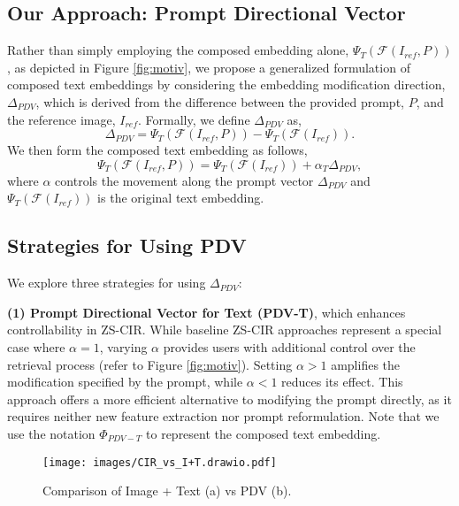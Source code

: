 \subsection{Our Approach: Prompt Directional Vector}

Rather than simply employing the composed embedding alone, $\Psi_T(\mathcal{F}(I_{ref}, P))$, as depicted in Figure \ref{fig:motiv},
we propose a generalized formulation of composed text embeddings by considering the embedding modification direction, $\Delta_{PDV}$, which is derived from the difference between the provided prompt, $P$, and the reference image, $I_{ref}$. Formally, we define $\Delta_{PDV}$ as,
\begin{equation}
\Delta_{PDV} = \Psi_T(\mathcal{F}(I_{ref}, P)) - \Psi_T(\mathcal{F}(I_{ref})).
\label{eq:pdv}
\end{equation}
We then form the composed text embedding as follows,
\begin{equation}
	\Psi_T(\mathcal{F}(I_{ref}, P)) = \Psi_T(\mathcal{F}(I_{ref})) + \alpha_T\Delta_{PDV}, \label{eqn:text_embedding}
\end{equation}
{\noindent}where $\alpha$ controls the movement along the prompt vector $\Delta_{PDV}$ and $\Psi_T(\mathcal{F}(I_{ref}))$ is the original text embedding.

\subsection{Strategies for Using PDV}

We explore three strategies for using $\Delta_{PDV}$:

\textbf{(1) Prompt Directional Vector for Text (PDV-T)}, which enhances controllability in ZS-CIR. While baseline ZS-CIR approaches represent a special case where $\alpha=1$, varying $\alpha$ provides users with additional control over the retrieval process (refer to Figure \ref{fig:motiv}). Setting $\alpha>1$ amplifies the modification specified by the prompt, while $\alpha<1$ reduces its effect. This approach offers a more efficient alternative to modifying the prompt directly, as it requires neither new feature extraction nor prompt reformulation. Note that we use the notation $\Phi_{PDV-T}$ to represent the composed text embedding.

\begin{figure}[!tbh]
\vspace*{-0.4cm}
\centerline{
\texttt{[image: images/CIR\_vs\_I+T.drawio.pdf]}}
	\caption{Comparison of Image + Text (a) vs PDV (b).}
	\label{fig:vtvspv}
\end{figure}

